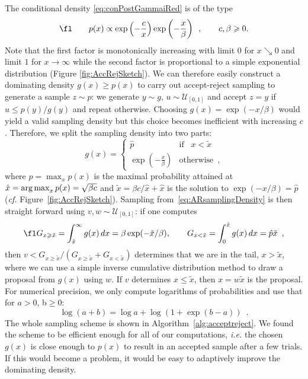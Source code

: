 The conditional density \eqref{eq:conPostGammaiRed} is of the type
\begin{equation}
\fl \qquad p(x) \propto \exp \left(- \frac{c}{x} \right) \exp \left(- \frac{x}{\beta} \right) \enspace, \qquad c, \beta \geqslant 0.
\end{equation}
Note that the first factor is monotonically increasing with limit $0$ for $x \searrow 0$ and limit $1$ for $x \rightarrow \infty$ while the second factor is proportional to a simple exponential distribution (\lcf Figure \ref{fig:AccRejSketch}). We can therefore easily construct a dominating density $g(x) \geqslant p(x)$ to carry out accept-reject sampling \cite[Section 2.3.2]{RoCa05} to generate a sample $z \sim p$: we generate $y \sim g$, $u \sim \mathcal{U}_{[0,1]}$ and accept $z = y$ if $u \leqslant p(y)/g(y)$ and repeat otherwise. Choosing $g(x) = \exp \left(- x/\beta\right)$ would yield a valid sampling density but this choice becomes inefficient with increasing $c$. Therefore, we split the sampling density into two parts:
\begin{equation}
g(x) = 
\begin{cases}
\hat p & \text{if} \hspace{10pt} x < \tilde{x} \\
\exp \left(- \frac{x}{\beta} \right)	& \text{otherwise}  \enspace,
\end{cases}
\label{eq:ARsamplingDensity}
\end{equation}
where $\hat p = \max_x p(x)$ is the maximal probability attained at $\hat x = \mathop{\mathrm{arg}\,\mathrm{max}}_x p(x) = \sqrt{\beta c}$ and $\tilde{x} = \beta c/\hat x + \hat x$ is the solution to $\exp \left(- x/\beta\right) = \hat p$ (\textit{cf.} Figure~\ref{fig:AccRejSketch}). Sampling from~\eqref{eq:ARsamplingDensity} is then straight forward using $v, w \sim \mathcal{U}_{[0,1]}$: if one computes
\begin{equation}
\fl G_{x\geqslant \tilde{x}} = \int_{\tilde{x}}^\infty g(x) \, dx = \beta \exp(- \tilde{x}/\beta), \qquad
G_{x < \tilde{x}} = \int_0^{\tilde{x}} g(x) \, dx = \hat{p} \tilde{x} \enspace,
\end{equation}
then $v <  G_{x\geqslant \tilde{x}} / (G_{x\geqslant \tilde{x}} + G_{x < \tilde{x}})$ determines that we are in the tail, $x > \tilde{x}$, where we can use a simple inverse cumulative distribution method to draw a proposal from $g(x)$ using $w$. If $v$ determines $x \leqslant \tilde{x}$, then $x = w \tilde{x}$ is the proposal. For numerical precision, we only compute logarithms of probabilities and use that for $a > 0$, b$\geqslant 0$:
 \begin{equation}
 \log \left(a +b \right) = \log a + \log \left(1 + \exp \left(b - a \right)\right) \enspace .
 \end{equation}
 The whole sampling scheme is shown in Algorithm~\ref{alg:acceptreject}. We found the scheme to be efficient enough for all of our computations, \textit{i.e.} the chosen $g(x)$ is close enough to $p(x)$ to result in an accepted sample after a few trials. If this would become a problem, it would be easy to adaptively improve the dominating density.


